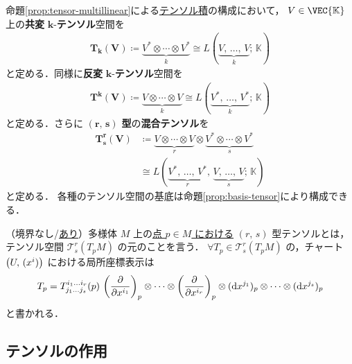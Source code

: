 \documentclass[geometry_main]{subfiles}
\begin{document}
命題\ref{prop:tensor-multillinear}による\hyperref[def:univ-tensor-vec]{テンソル積}の構成において，
$V \in \VEC{\mathbb{K}}$ 上の\textbf{共変} $\bm{k}$-\textbf{テンソル}空間を
\begin{align}
	\bm{T_k (V)} \coloneqq \underbrace{V^* \otimes \cdots \otimes V^*}_{k} \cong L(\underbrace{V,\, \dots ,\, V}_k;\, \mathbb{K})
\end{align}
と定める．同様に\textbf{反変} $\bm{k}$-\textbf{テンソル}空間を
\begin{align}
	\bm{T^k (V)} \coloneqq \underbrace{V \otimes \cdots \otimes V}_{k} \cong L(\underbrace{V^*,\, \dots ,\, V^*}_k;\, \mathbb{K})
\end{align}
と定める．さらに $\bm{(r,\, s)}$ \textbf{型}の\textbf{混合テンソル}を
\begin{align}
	\bm{T^r_s(V)} &\coloneqq \underbrace{V \otimes \cdots \otimes V}_{r} \otimes \underbrace{V^* \otimes \cdots \otimes V^*}_s \\
	&\cong L(\underbrace{V^*,\, \dots ,\, V^*}_r,\, \underbrace{V,\, \dots ,\, V}_s ;\, \mathbb{K})
\end{align}
と定める．
各種のテンソル空間の基底は命題\ref{prop:basis-tensor}により構成できる．

（境界なし/\hyperref[def:mani-with-boundary]{あり}）\cinfty 多様体 $M$ 上の\underline{点 $p \in M$ における} $(r,\, s)$ 型テンソルとは，テンソル空間 $\mathcal{T}^r_s(T_pM)$ の元のことを言う．
$\forall T_p \in \mathcal{T}^r_s(T_pM)$ の，チャート $\bigl(U,\, (x^i)\bigr)$ における局所座標表示は
\begin{align} 
	T_p = T^{i_1 \dots i_r}_{j_1 \dots j_s} (p) \, \left(\pdv{}{x^{i_1}}\right)_p \otimes \cdots \otimes \left(\pdv{}{x^{i_r}}\right)_p \otimes (\dd{x^{j_1}})_p \otimes \cdots \otimes (\dd{x^{j_s}})_p
\end{align}
と書かれる．

\subsection{テンソルの作用}
\end{document}
